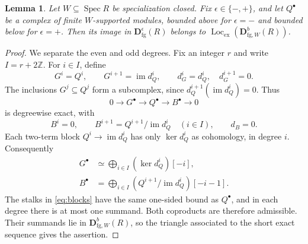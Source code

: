 \documentclass[11pt]{amsart}
\numberwithin{equation}{section}
\newtheorem{lemma}[theorem]{Lemma}
\theoremstyle{definition}
\theoremstyle{remark}
\DeclareMathOperator{\Spec}{Spec}
\DeclareMathOperator{\Loc}{Loc}
\newcommand{\D}{\mathbf D}
\newcommand{\fg}{\mathrm{fg}}
\newcommand{\Lex}{\Loc_{\mathrm{ex}}}
\begin{document}
\begin{lemma}\label{lem:blocks}
Let $W\subseteq\Spec R$ be specialization closed.
Fix $\epsilon\in\{-,+\}$, and let $Q^{\bullet}$ be a complex of finite
$W$-supported modules, bounded above for $\epsilon=-$ and bounded below
for $\epsilon=+$.
Then its image in $\D^\epsilon_{\fg}(R)$ belongs to $\Lex(\D^b_{\fg,W}(R))$.
\end{lemma}
\begin{proof}
We separate the even and odd degrees. Fix an integer $r$ and write
$I=r+2\mathbb Z$. For $i\in I$, define
\[
 G^i=Q^i,\qquad G^{i+1}=\operatorname{im}d_Q^i,
 \qquad d_G^i=d_Q^i,\quad d_G^{i+1}=0.
\]
The inclusions $G^j\subseteq Q^j$ form a subcomplex, since
$d_Q^{i+1}(\operatorname{im}d_Q^i)=0$. Thus
\[
 0\longrightarrow G^\bullet\longrightarrow Q^\bullet
   \longrightarrow B^\bullet\longrightarrow0
\]
is degreewise exact, with
\[
 B^i=0,\qquad B^{i+1}=Q^{i+1}/\operatorname{im}d_Q^i
 \quad(i\in I),\qquad d_B=0.
\]
Each two-term block $Q^i\to\operatorname{im}d_Q^i$ has only
$\ker d_Q^i$ as cohomology, in degree $i$. Consequently
\begin{equation}\label{eq:blocks}
\begin{aligned}
 G^\bullet&\simeq\bigoplus_{i\in I}(\ker d_Q^i)[-i],\\
 B^\bullet&=\bigoplus_{i\in I}
       (Q^{i+1}/\operatorname{im}d_Q^i)[-i-1].
\end{aligned}
\end{equation}
The stalks in \eqref{eq:blocks} have the same one-sided bound as
$Q^\bullet$, and in each degree there is at most one summand. Both
coproducts are therefore admissible. Their summands lie in
$\D^b_{\fg,W}(R)$, so the triangle associated to the short exact
sequence gives the assertion.
\end{proof}
\end{document}
